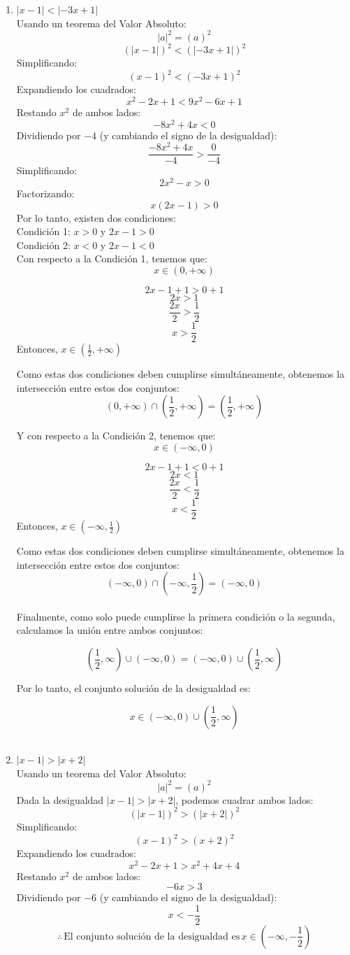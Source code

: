 \documentclass{article}
\begin{document}
\begin{enumerate}
  \item \(|x-1|<|-3x+1|\)\\
Usando un teorema del Valor Absoluto:
\[
|a|^2 = (a)^2
\]
\[
(|x-1|)^2 < (|-3x+1|)^2
\]
Simplificando:
\[
(x-1)^2 < (-3x+1)^2
\]
Expandiendo los cuadrados:
\[
x^2 - 2x + 1 < 9x^2 - 6x + 1
\]
Restando \(x^2\) de ambos lados:
\[
-8x^2 + 4x < 0
\]
Dividiendo por \(-4\) (y cambiando el signo de la desigualdad):
\[
\frac{-8x^2 + 4x}{-4} > \frac{0}{-4}
\]
Simplificando:
\[
2x^2 - x > 0
\]
Factorizando:
\[
x(2x-1) > 0
\]
Por lo tanto, existen dos condiciones:\\
Condición 1: \( x > 0 \) y \( 2x - 1 > 0 \)\\
Condición 2: \( x < 0 \) y \( 2x - 1 < 0 \)\\

Con respecto a la Condición 1, tenemos que:
\[
x \in \left(0, +\infty\right)
\]

\[
2x - 1 + 1 > 0 + 1
\]
\[
2x > 1
\]
\[
\frac{2x}{2} > \frac{1}{2}
\]
\[
x > \frac{1}{2}
\]
Entonces, \( x \in \left(\frac{1}{2}, +\infty\right) \)

Como estas dos condiciones deben cumplirse simultáneamente, obtenemos la intersección entre estos dos conjuntos:
\[
(0, +\infty) \cap \left(\frac{1}{2}, +\infty\right) = \left(\frac{1}{2}, +\infty\right)
\]

Y con respecto a la Condición 2, tenemos que:
\[
x \in \left(-\infty, 0\right)
\]

\[
2x - 1 + 1 < 0 + 1
\]
\[
2x < 1
\]
\[
\frac{2x}{2} < \frac{1}{2}
\]
\[
x < \frac{1}{2}
\]
Entonces, \( x \in \left(-\infty, \frac{1}{2}\right) \)

Como estas dos condiciones deben cumplirse simultáneamente, obtenemos la intersección entre estos dos conjuntos:
\[
(-\infty, 0) \cap \left(-\infty, \frac{1}{2}\right) = \left(-\infty, 0\right)
\]\\

Finalmente, como solo puede cumplirse la primera condición o la segunda, calculamos la unión entre ambos conjuntos:

\[
\left(\frac{1}{2}, \infty\right) \cup \left(-\infty, 0\right) = (-\infty, 0) \cup \left(\frac{1}{2}, \infty\right)
\]

Por lo tanto, el conjunto solución de la desigualdad es:

\[
x \in (-\infty, 0) \cup \left(\frac{1}{2}, \infty\right)
\]\\


  \item \(|x-1|>|x+2|\)\\
Usando un teorema del Valor Absoluto:
\[
|a|^2 = (a)^2
\]
Dada la desigualdad \( |x-1| > |x+2| \), podemos cuadrar ambos lados:
\[
(|x-1|)^2 > (|x+2|)^2
\]
Simplificando:
\[
(x-1)^2 > (x+2)^2
\]
Expandiendo los cuadrados:
\[
x^2 - 2x + 1 > x^2 + 4x + 4
\]
Restando \(x^2\) de ambos lados:
\[
-6x > 3
\]
Dividiendo por \(-6\) (y cambiando el signo de la desigualdad):
\[
x < -\frac{1}{2}
\]
\[
\therefore \, \text{El conjunto solución de la desigualdad es} \, x \in (-\infty, -\frac{1}{2})
\]


\end{enumerate}
\end{document}
